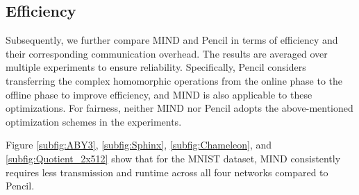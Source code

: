 \documentclass[conference]{IEEEtran}
\begin{document}
\subsection{Efficiency}






Subsequently, we further compare MIND and Pencil in terms of efficiency and their corresponding communication overhead.
The results are averaged over multiple experiments to ensure reliability.
Specifically, Pencil \cite{liu2024pencilprivateextensiblecollaborative} considers transferring the complex homomorphic operations from the online phase to the offline phase to improve efficiency, and MIND is also applicable to these optimizations.
For fairness, neither MIND nor Pencil adopts the above-mentioned optimization schemes in the experiments.









 



Figure \ref{subfig:ABY3}, \ref{subfig:Sphinx}, \ref{subfig:Chameleon}, and \ref{subfig:Quotient_2x512} show that for the MNIST dataset, MIND consistently requires less transmission and runtime across all four networks compared to Pencil.

\end{document}
